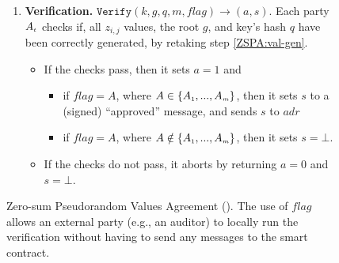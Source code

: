 \begin{figure}[ht]
\begin{center}
\begin{tcolorbox}[enhanced,width=5.5in, 
    drop fuzzy shadow southwest,
    colframe=black,colback=white]
{\begin{enumerate}
\begin{enumerate}
\item sends the Merkel tree's root: $g$,   and the key's hash: $q=\mathtt {H}(k)$ to $adr$. 

\end{enumerate}

\item\label{ZSPA:verify}{\textbf{Verification.} $\mathtt{Verify}(k, g, q, m, flag)\rightarrow (a, s)$}. 
%
Each party $A_{\scriptscriptstyle t}$ checks if, all $z_{\scriptscriptstyle i,j}$ values, the root $g$, and key's hash $q$ have been correctly generated, by retaking  step \ref{ZSPA:val-gen}. 
%
\begin{itemize}
\item If the checks pass, then it sets $a=1$ and
\begin{itemize}
\item if $flag=A$, where $A\in \{    A_{\scriptscriptstyle 1},...,  A_{\scriptscriptstyle m}\}$, then  it sets $s$ to a (signed) ``approved'' message, and sends $s$ to $adr$
\item  if $flag= A$, where $A\notin \{    A_{\scriptscriptstyle 1},...,  A_{\scriptscriptstyle m}\}$, then it sets $s = \bot$. 
\end{itemize}
\item If the checks do not pass, it aborts by returning $a=0$ and $s = \bot$. 
\end{itemize}
%
 \end{enumerate}
}
 \end{tcolorbox}
\end{center}
\caption{Zero-sum Pseudorandom Values Agreement (\zspa). The use of $flag$ allows an external party (e.g., an auditor) to locally run the verification without having to send any messages to the smart contract.} 
\label{fig:ZSPA}
\end{figure}

